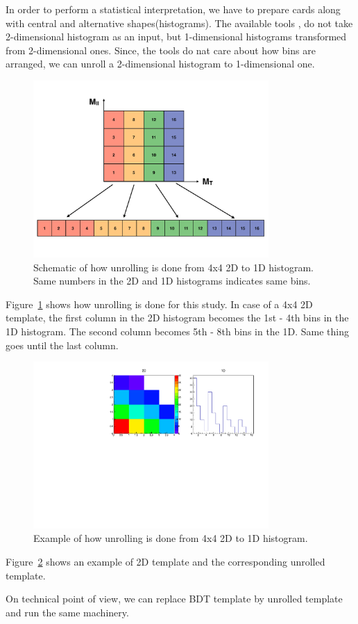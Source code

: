 In order to perform a statistical interpretation, we have to prepare cards 
along with central and alternative shapes(histograms). The available tools \cite{lands}, \cite{combine}
do not take 2-dimensional histogram as an input, but 1-dimensional histograms
transformed from 2-dimensional ones. Since, the tools do nat care about 
how bins are arranged, we can unroll a 2-dimensional histogram to 1-dimensional one.

\begin{figure}[htp]
	\centering
	\includegraphics[width=0.8\textwidth]{figures/unrolling_schematic.pdf}
	\caption{ Schematic of how unrolling is done from 4x4 2D to 1D histogram. 
			  Same numbers in the 2D and 1D histograms indicates same bins.} 
  	\label{fig:unrolling_sch}
\end{figure}

Figure~\ref{fig:unrolling_sch} shows how unrolling is done for this study. 
In case of a 4x4 2D template, the first column in the 2D histogram 
becomes the 1st - 4th bins in the 1D histogram. The second column becomes 
5th - 8th bins in the 1D. Same thing goes until the last column.  

\begin{figure}[htp]
	\centering
	\includegraphics[width=0.8\textwidth]{figures/unrolling_example.pdf}
	\caption{ Example of how unrolling is done from 4x4 2D to 1D histogram.} 
  	\label{fig:unrolling_ex}
\end{figure}

Figure~\ref{fig:unrolling_ex} shows an example of 2D template and 
the corresponding unrolled template.  

On technical point of view, we can replace BDT template by unrolled 
template and run the same machinery.  

